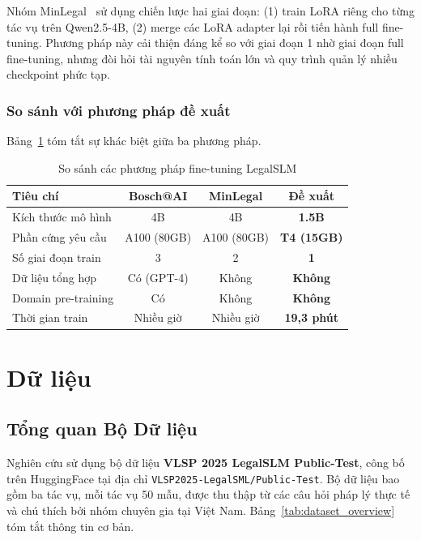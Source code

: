 \documentclass[fontsize=13pt,a4paper,oneside,DIV=calc,chapterprefix=true]{scrbook}
\begin{document}
Nhóm MinLegal~\cite{minlegal2025} sử dụng chiến lược hai giai đoạn: (1) train LoRA riêng cho
từng tác vụ trên Qwen2.5-4B, (2) merge các LoRA adapter lại rồi tiến hành full fine-tuning.
Phương pháp này cải thiện đáng kể so với giai đoạn 1 nhờ giai đoạn full fine-tuning, nhưng
đòi hỏi tài nguyên tính toán lớn và quy trình quản lý nhiều checkpoint phức tạp.

\subsection{So sánh với phương pháp đề xuất}

Bảng~\ref{tab:compare_methods} tóm tắt sự khác biệt giữa ba phương pháp.

\begin{table}[H]
\centering
\caption{So sánh các phương pháp fine-tuning LegalSLM}
\label{tab:compare_methods}
\begin{tabular}{lccc}
\toprule
\textbf{Tiêu chí} & \textbf{Bosch@AI} & \textbf{MinLegal} & \textbf{Đề xuất} \\
\midrule
Kích thước mô hình & 4B & 4B & \textbf{1.5B} \\
Phần cứng yêu cầu & A100 (80GB) & A100 (80GB) & \textbf{T4 (15GB)} \\
Số giai đoạn train & 3 & 2 & \textbf{1} \\
Dữ liệu tổng hợp & Có (GPT-4) & Không & \textbf{Không} \\
Domain pre-training & Có & Không & \textbf{Không} \\
Thời gian train & Nhiều giờ & Nhiều giờ & \textbf{19,3 phút} \\
\bottomrule
\end{tabular}
\end{table}

\chapter{Dữ liệu}
\label{chap:data}

\section{Tổng quan Bộ Dữ liệu}

Nghiên cứu sử dụng bộ dữ liệu \textbf{VLSP 2025 LegalSLM Public-Test}, công bố trên HuggingFace
tại địa chỉ \texttt{VLSP2025-LegalSML/Public-Test}. Bộ dữ liệu bao gồm ba tác vụ, mỗi tác vụ
50 mẫu, được thu thập từ các câu hỏi pháp lý thực tế và chú thích bởi nhóm chuyên gia tại
Việt Nam. Bảng~\ref{tab:dataset_overview} tóm tắt thông tin cơ bản.
\end{document}
